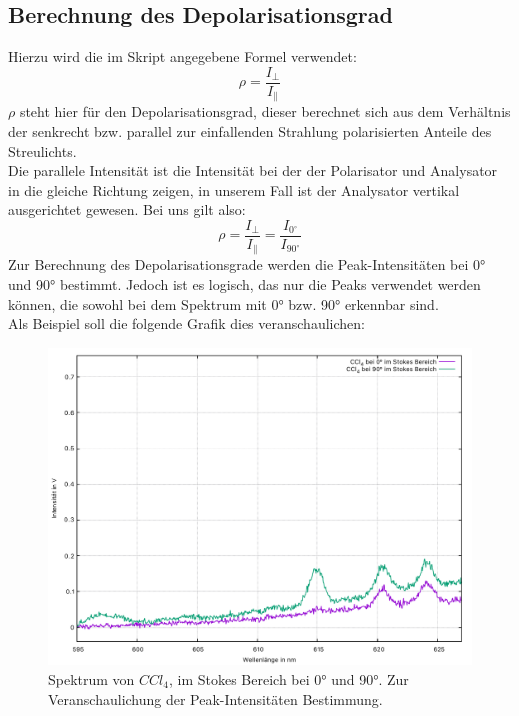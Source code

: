 \subsection{Berechnung des Depolarisationsgrad}
Hierzu wird die im Skript angegebene Formel verwendet:\\
\begin{equation}
    \rho = \frac{I_{\perp}}{I_{\parallel}}
\end{equation}
$\rho$ steht hier für den Depolarisationsgrad, dieser berechnet sich aus 
dem Verhältnis der senkrecht bzw. parallel zur einfallenden Strahlung polarisierten Anteile
des Streulichts. \\
Die parallele Intensität ist die Intensität bei der der Polarisator und Analysator 
in die gleiche Richtung zeigen, in unserem Fall ist der Analysator vertikal ausgerichtet
gewesen. Bei uns gilt also: \\
\begin{equation}
    \rho = \frac{I_{\perp}}{I_{\parallel}} = \frac{I_{0^{\circ}}}{I_{90^{\circ}}}
\end{equation}
Zur Berechnung des Depolarisationsgrade werden die Peak-Intensitäten bei 0° und 90° bestimmt. Jedoch ist es 
logisch, das nur die Peaks verwendet werden können, die sowohl bei dem Spektrum mit 0° bzw. 90° erkennbar sind.\\
Als Beispiel soll die folgende Grafik dies veranschaulichen:
\begin{figure}[h]
  \centering
  \includegraphics[scale=0.6]{Bilder/Verbesserung_Auswertung/Depol.pdf}
  \caption{Spektrum von $CCl_4$, im Stokes Bereich bei 0° und 90°. Zur Veranschaulichung der Peak-Intensitäten Bestimmung.}
\end{figure}\\
